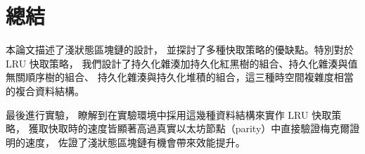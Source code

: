 \chapter{總結}

本論文描述了淺狀態區塊鏈的設計，
並探討了多種快取策略的優缺點。特別對於 LRU 快取策略，
我們設計了持久化雜湊加持久化紅黑樹的組合、持久化雜湊與值無關順序樹的組合、
持久化雜湊與持久化堆積的組合，這三種時空間複雜度相當的複合資料結構。

最後進行實驗，
瞭解到在實驗環境中採用這幾種資料結構來實作 LRU 快取策略，
獲取快取時的速度皆顯著高過真實以太坊節點（parity）中直接驗證梅克爾證明的速度，
佐證了淺狀態區塊鏈有機會帶來效能提升。